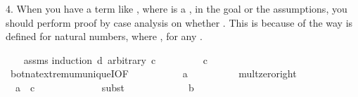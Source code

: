 \begin{isabellebody}
\begin{isamarkuptext}
  4. When you have a term like , where  is a , in the goal or the assumptions, you 
     should perform proof by case analysis on whether . This is because of the way \isa{{\isacharminus}{\kern0pt}} is
     defined for natural numbers, where , for any .%
\end{isamarkuptext}\isamarkuptrue%
%
\isadelimproof
\ \ %
\endisadelimproof
%
\isatagproof
{}\isamarkupfalse%
\ assms\isanewline
{}\isamarkupfalse%
{\isacharparenleft}{\kern0pt}induction\ d\ arbitrary{\isacharcolon}{\kern0pt}\ c{\isacharparenright}{\kern0pt}\isanewline
\ \ \isamarkupfalse%
\ {}\isanewline
\ \ \isamarkupfalse%
\ {}{\isacharcolon}{\kern0pt}\ {\isachardoublequoteopen}c\ {\isacharequal}{\kern0pt}\ {}{\isachardoublequoteclose}\isanewline
\ \ \ \ \isamarkupfalse%
\ bot{\isacharunderscore}{\kern0pt}nat{\isacharunderscore}{\kern0pt}{}{\isachardot}{\kern0pt}extremum{\isacharunderscore}{\kern0pt}uniqueI{\isacharbrackleft}{\kern0pt}OF\ {\isachardoublequoteopen}{}{\isachardoublequoteclose}{\isacharparenleft}{\kern0pt}{}{\isacharparenright}{\kern0pt}{\isacharbrackright}{\kern0pt}\isanewline
\ \ \ \ \isacommand{{\isachardot}{\kern0pt}}\isamarkupfalse%
\isanewline
\ \ \isamarkupfalse%
\ {}{\isacharcolon}{\kern0pt}\ {\isachardoublequoteopen}a\ {\isacharasterisk}{\kern0pt}\ {}\ {\isacharequal}{\kern0pt}\ {}{\isachardoublequoteclose}\isanewline
\ \ \ \ \isamarkupfalse%
\ mult{\isacharunderscore}{\kern0pt}zero{\isacharunderscore}{\kern0pt}right\isanewline
\ \ \ \ \isacommand{{\isachardot}{\kern0pt}}\isamarkupfalse%
\ \isanewline
\isanewline
\ \ \isamarkupfalse%
\ {}{\isacharcolon}{\kern0pt}\ {\isachardoublequoteopen}a\ {\isacharasterisk}{\kern0pt}\ c\ {\isacharequal}{\kern0pt}\ {}{\isachardoublequoteclose}\isanewline
\ \ \ \ \isamarkupfalse%
\ {}\isanewline
\ \ \ \ \isamarkupfalse%
{\isacharparenleft}{\kern0pt}subst\ {}{\isacharparenright}{\kern0pt}\isanewline
\ \ \ \ \isacommand{{\isachardot}{\kern0pt}}\isamarkupfalse%
\isanewline
\isanewline
\ \ \isamarkupfalse%
\ {}{\isacharcolon}{\kern0pt}\ {\isachardoublequoteopen}{}\ {\isasymle}\ b\ {\isacharasterisk}{\kern0pt}\ {}{\isachardoublequoteclose}\isanewline

\end{isabellebody}
